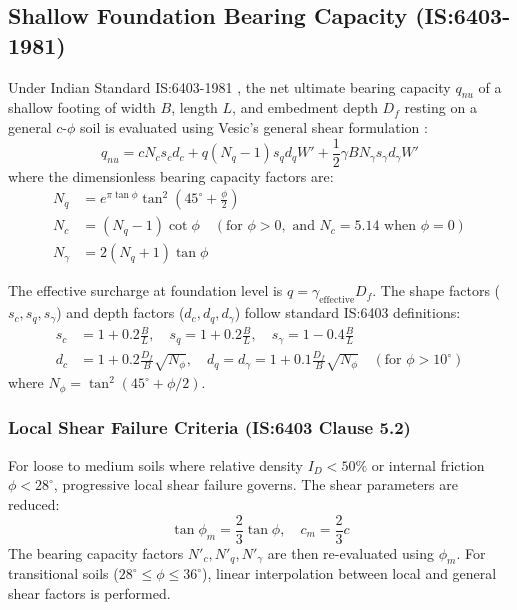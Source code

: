 \documentclass[11pt,a4paper]{article}
\begin{document}
\subsection{Shallow Foundation Bearing Capacity (IS:6403-1981)}

Under Indian Standard IS:6403-1981 \cite{is6403}, the net ultimate bearing capacity $q_{nu}$ of a shallow footing of width $B$, length $L$, and embedment depth $D_f$ resting on a general $c$-$\phi$ soil is evaluated using Vesic's general shear formulation \cite{vesic1973analysis,meyerhof1963ultimate}:
\begin{equation}
q_{nu} = c N_c s_c d_c + q (N_q - 1) s_q d_q W' + \frac{1}{2} \gamma B N_\gamma s_\gamma d_\gamma W'
\end{equation}
where the dimensionless bearing capacity factors are:
\begin{align}
N_q &= e^{\pi \tan \phi} \tan^2\left(45^\circ + \frac{\phi}{2}\right) \\
N_c &= (N_q - 1)\cot \phi \quad (\text{for } \phi > 0, \text{ and } N_c = 5.14 \text{ when } \phi = 0) \\
N_\gamma &= 2(N_q + 1)\tan \phi
\end{align}

The effective surcharge at foundation level is $q = \gamma_{\text{effective}} D_f$. The shape factors ($s_c, s_q, s_\gamma$) and depth factors ($d_c, d_q, d_\gamma$) follow standard IS:6403 definitions:
\begin{align}
s_c &= 1 + 0.2\frac{B}{L}, \quad s_q = 1 + 0.2\frac{B}{L}, \quad s_\gamma = 1 - 0.4\frac{B}{L} \\
d_c &= 1 + 0.2\frac{D_f}{B}\sqrt{N_\phi}, \quad d_q = d_\gamma = 1 + 0.1\frac{D_f}{B}\sqrt{N_\phi} \quad (\text{for } \phi > 10^\circ)
\end{align}
where $N_\phi = \tan^2(45^\circ + \phi/2)$.

\subsubsection{Local Shear Failure Criteria (IS:6403 Clause 5.2)}
For loose to medium soils where relative density $I_D < 50\%$ or internal friction $\phi < 28^\circ$, progressive local shear failure governs. The shear parameters are reduced:
\begin{equation}
\tan \phi_m = \frac{2}{3}\tan \phi, \quad c_m = \frac{2}{3}c
\end{equation}
The bearing capacity factors $N'_c, N'_q, N'_\gamma$ are then re-evaluated using $\phi_m$. For transitional soils ($28^\circ \le \phi \le 36^\circ$), linear interpolation between local and general shear factors is performed.
\end{document}

